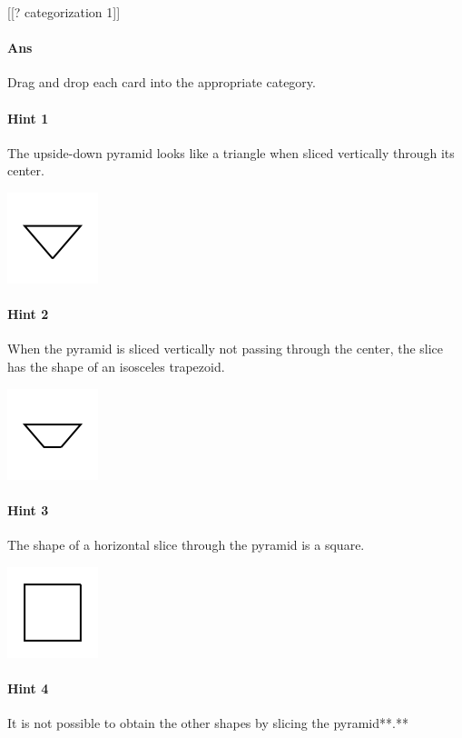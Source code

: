 \documentclass[twocolumn,10pt]{article}
\def\shrinkfactor{0.4}
\begin{document}
[[? categorization 1]]

\paragraph{Ans} Drag and drop each card into the appropriate category. 

\paragraph{Hint 1}The upside-down pyramid looks like a triangle when sliced vertically through its center.  

\includegraphics[scale=\shrinkfactor]{figures/f9f5acc90c6c1dd156d5024f368afd3d7d9de230.png}

\paragraph{Hint 2}When the pyramid is sliced vertically not passing through the center, the slice has the shape of an isosceles trapezoid.   

\includegraphics[scale=\shrinkfactor]{figures/74b03954d4d97fddf5e1a1fb63ad8480bd41aaa9.png}

\paragraph{Hint 3}The shape of a horizontal slice through the pyramid is a square.  

\includegraphics[scale=\shrinkfactor]{figures/4b59a0ece6acc7c19c389e1de534d1df93bf1169.png}

\paragraph{Hint 4}It is not possible to obtain the other shapes by slicing the pyramid**.**
\end{document}
